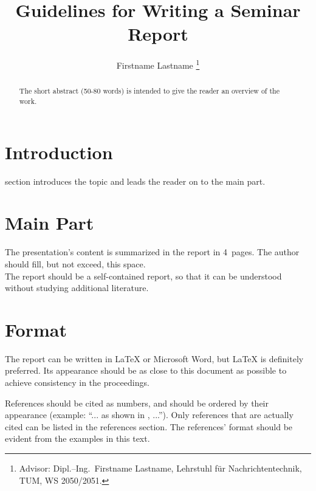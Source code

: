 \documentclass[journal, a4paper]{IEEEtran}
\begin{document}
	\title{Guidelines for Writing a Seminar Report}
	\author{Firstname Lastname
	\thanks{Advisor: Dipl.--Ing.~Firstname Lastname, Lehrstuhl f\"ur Nachrichtentechnik, TUM, WS 2050/2051.}}
	\maketitle

\begin{abstract}
	The short abstract (50-80 words) is intended to give the reader an overview of the work.
\end{abstract}

\section{Introduction}
	 section introduces the topic and leads the reader on to the main part.

\section{Main Part}
	The presentation's content is summarized in the report in 4~pages.
	The author should fill, but not exceed, this space. \\
	The report should be a self-contained report, so that it can be understood without studying additional literature.

\section{Format}
	The report can be written in \LaTeX{} or Microsoft Word, but \LaTeX{} is definitely preferred.
	Its appearance should be as close to this document as possible to achieve consistency in the proceedings.

	References should be cited as numbers, and should be ordered by their appearance (example: ``... as shown in \cite{HOP96}, ...'').
	Only references that are actually cited can be listed in the references section.
	The references' format should be evident from the examples in this text.
\end{document}
